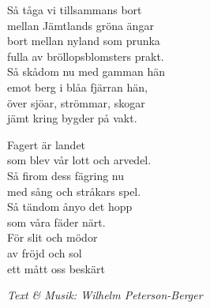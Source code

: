 \vspace{10pt}
Så tåga vi tillsammans bort\\
mellan Jämtlands gröna ängar\\
bort mellan nyland som prunka\\
fulla av bröllopsblomsters prakt.\\
Så skådom nu med gamman hän\\
emot berg i blåa fjärran hän,\\
över sjöar, strömmar, skogar\\
jämt kring bygder på vakt.\par
\vspace{10pt}
\revrpt Fagert är landet\\
som blev vår lott och arvedel.\\
Så firom dess fägring nu\\
med sång och stråkars spel.\\
Så tändom ånyo det hopp\\
som våra fäder närt.\\
För slit och mödor\\
av fröjd och sol\\
ett mått oss beskärt\rpt\par
\vspace{10pt}
{\footnotesize\textit{Text \& Musik: Wilhelm Peterson-Berger}}
